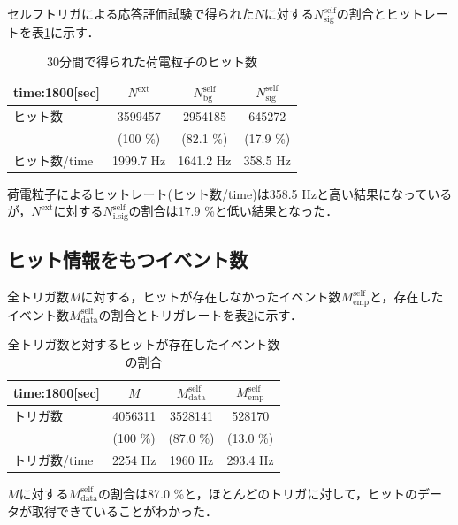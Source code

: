 セルフトリガによる応答評価試験で得られた$N$に対する$N_{\mathrm{sig}}^{\mathrm{self}}$の割合とヒットレートを表\ref{tab:selfp}に示す．
\begin{table}[h]
  \centering
  \caption{30分間で得られた荷電粒子のヒット数}
  \begin{tabular} {l|ccc} \hline
    time:1800[sec]& $N^{\mathrm{ext}}$ & $N_{\mathrm{bg}}^{\mathrm{self}}$ & $N_{\mathrm{sig}}^{\mathrm{self}}$ \\ \hline \hline
    ヒット数 & 3599457 & 2954185 & 645272 \\
    & (100 \%) & (82.1 \%) & (17.9 \%) \\ \hline
    ヒット数/time & 1999.7 $\mathrm{Hz}$ & 1641.2 $\mathrm{Hz}$ & 358.5 $\mathrm{Hz}$ \\ \hline
  \end{tabular}
  \label{tab:selfp}
\end{table}

荷電粒子によるヒットレート(ヒット数/time)は358.5 $\mathrm{Hz}$と高い結果になっているが，$N^{\mathrm{ext}}$に対する$N_{\mathrm{i.sig}}^{\mathrm{self}}$の割合は17.9 \%と低い結果となった．

\subsection*{ヒット情報をもつイベント数}
全トリガ数$M$に対する，ヒットが存在しなかったイベント数$M_{\mathrm{emp}}^{\mathrm{self}}$と，存在したイベント数$M_{\mathrm{data}}^{\mathrm{self}}$の割合とトリガレートを表\ref{tab:selfr}に示す．

\begin{table}[h]
  \centering
  \caption{全トリガ数と対するヒットが存在したイベント数の割合}
  \begin{tabular} {l|ccc} \hline
    time:1800[sec] & $M$ & $M_{\mathrm{data}}^{\mathrm{self}}$ & $M_{\mathrm{emp}}^{\mathrm{self}}$ \\ \hline \hline
    トリガ数 & 4056311 & 3528141 & 528170 \\
     & (100 \%) & (87.0 \%) & (13.0 \%) \\ \hline
    トリガ数/time & 2254 $\mathrm{Hz}$ & 1960 $\mathrm{Hz}$ & 293.4 $\mathrm{Hz}$ \\ \hline
  \end{tabular}
  \label{tab:selfr}
\end{table}

$M$に対する$M_{\mathrm{data}}^{\mathrm{self}}$の割合は87.0 \%と，ほとんどのトリガに対して，ヒットのデータが取得できていることがわかった．

